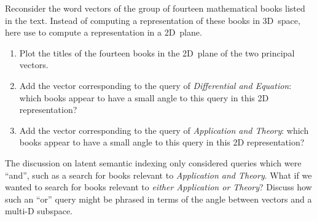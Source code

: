 \begin{exercise} \label{ex:} 
Reconsider the word vectors of the group of fourteen mathematical books listed in the text. 
Instead of computing a representation of these books in 3D~space, here use  to compute a representation in a 2D~plane.
\begin{enumerate}
\item Plot the titles of the fourteen books in the 2D~plane of the two principal vectors.

\item Add the vector corresponding to the query of \emph{Differential and Equation}: which books appear to have a small angle to this query in this 2D representation?


\item Add the vector corresponding to the query of \emph{Application and Theory}: which books appear to have a small angle to this query in this 2D representation?

\end{enumerate}
\end{exercise}




\begin{exercise} \label{ex:} 
The discussion on latent semantic indexing only considered queries which were ``and'', such as a search for books relevant to \emph{Application and Theory}.
What if we wanted to search for books relevant to \emph{either Application or Theory}?
Discuss how such an ``or'' query might be phrased in terms of the angle between vectors and a multi-D subspace.
\end{exercise}




